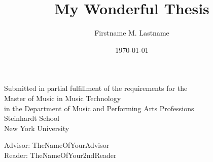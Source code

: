 \documentclass[12pt]{article}
\begin{document}
\author{Firstname M. Lastname} 
\title{My Wonderful Thesis}
\date{}
\maketitle

\vspace{75mm}

\begin{center}
Submitted in partial fulfillment of the requirements for the \\
Master of Music in Music Technology \\
in the Department of Music and Performing Arts Professions \\
Steinhardt School \\
New York University \\

\vspace{10mm}

Advisor: TheNameOfYourAdvisor \\
Reader: TheNameOfYour2ndReader \\

\vspace{10mm}
\date{\today}
\end{center}
\thispagestyle{empty}













\appendix 

\end{document}
